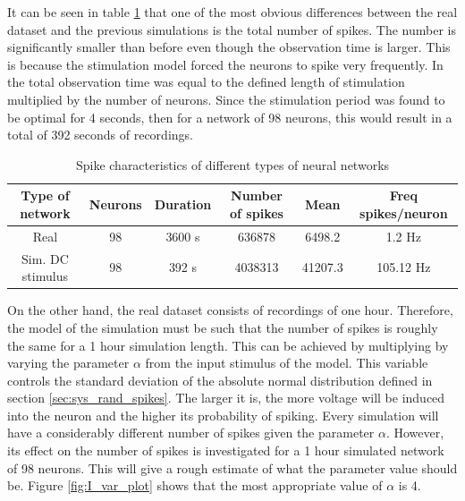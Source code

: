 It can be seen in table \ref{tab:spike_characteristics} that one of the most obvious differences between the real dataset and the previous simulations is the total number of spikes. The number is significantly smaller than before even though the observation time is larger. This is because the stimulation model forced the neurons to spike very frequently. In \cite{alexandru2018estimating} the total observation time was equal to the defined length of stimulation multiplied by the number of neurons. Since the stimulation period was found to be optimal for 4 seconds, then for a network of 98 neurons, this would result in a total of 392 seconds of recordings. \\ 

\begin{table}[]
\centering
\begin{tabular}{|c|c|c|c|c|c|}
\hline
Type of network  & Neurons & Duration & Number of spikes & Mean    & Freq spikes/neuron \\ \hline
Real             & 98                & 3600 s           & 636878           & 6498.2  & 1.2 Hz               \\ \hline
Sim. DC stimulus & 98                & 392 s            & 4038313          & 41207.3 & 105.12 Hz            \\ \hline
\end{tabular}
\caption{Spike characteristics of different types of neural networks}
\label{tab:spike_characteristics}
\end{table}

On the other hand, the real dataset consists of recordings of one hour. Therefore, the model of the simulation must be such that the number of spikes is roughly the same for a 1 hour simulation length. This can be achieved by multiplying by varying the parameter \(\alpha\) from the input stimulus of the model. This variable controls the standard deviation of the absolute normal distribution defined in section \ref{sec:sys_rand_spikes}. The larger it is, the more voltage will be induced into the neuron and the higher its probability of spiking.
Every simulation will have a considerably different number of spikes given the parameter \(\alpha\). However, its effect on the number of spikes is investigated for a 1 hour simulated network of 98 neurons. This will give a rough estimate of what the parameter value should be. Figure \ref{fig:I_var_plot} shows that the most appropriate value of \(\alpha\) is 4. 

